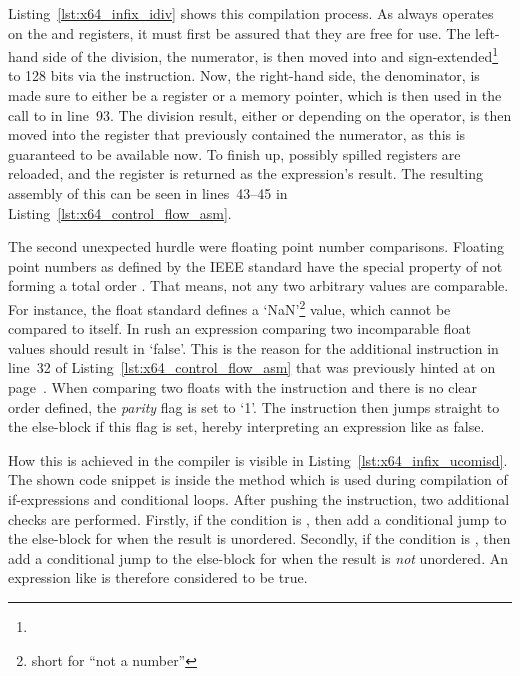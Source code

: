 
Listing~\ref{lst:x64_infix_idiv} shows this compilation process.
As  always operates on the  and  registers, it must first be assured that they are free for use.
The left-hand side of the division, the numerator, is then moved into  and sign-extended\footnote{} to 128 bits via the  instruction.
Now, the right-hand side, the denominator, is made sure to either be a register or a memory pointer, which is then used in the call to  in line~93.
The division result, either  or  depending on the operator, is then moved into the register that previously contained the numerator, as this is guaranteed to be available now.
To finish up, possibly spilled registers are reloaded, and the register is returned as the expression's result.
The resulting assembly of this can be seen in lines~43--45 in Listing~\ref{lst:x64_control_flow_asm}.

The second unexpected hurdle were floating point number comparisons.
Floating point numbers as defined by the IEEE standard have the special property of not forming a total order .
That means, not any two arbitrary values are comparable.
For instance, the float standard defines a `NaN'\footnote{short for ``not a number''} value, which cannot be compared to itself.
In rush an expression comparing two incomparable float values should result in `false'.
This is the reason for the additional  instruction in line~32 of Listing~\ref{lst:x64_control_flow_asm} that was previously hinted at on page~\pageref{x64_ucomisd}.
When comparing two floats with the  instruction and there is no clear order defined, the \emph{parity} flag is set to `1'.
The  instruction then jumps straight to the else-block if this flag is set, hereby interpreting an expression like  as false.


How this is achieved in the compiler is visible in Listing~\ref{lst:x64_infix_ucomisd}.
The shown code snippet is inside the  method which is used during compilation of if-expressions and conditional loops.
After pushing the  instruction, two additional checks are performed.
Firstly, if the condition is \qVerb{==}, then add a conditional jump to the else-block for when the result is unordered.
Secondly, if the condition is \qVerb{!=}, then add a conditional jump to the else-block for when the result is \emph{not} unordered.
An expression like  is therefore considered to be true.
